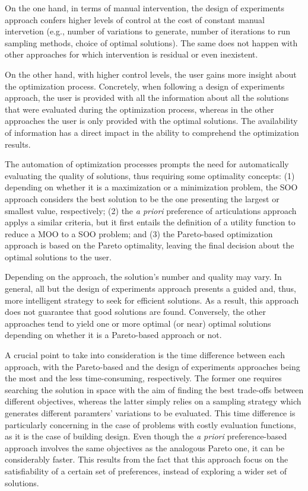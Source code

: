 	On the one hand, in terms of manual intervention, the design of experiments approach confers higher levels of control at the cost of constant manual intervetion (e.g., number of variations to generate, number of iterations to run sampling methods, choice of optimal solutions). The same does not happen with other approaches for which intervention is residual or even inexistent.	
	
	On the other hand, with higher control levels, the user gains more insight about the optimization process. Concretely, when following a design of experiments approach, the user is provided with all the information about all the solutions that were evaluated during the optimization process, whereas in the other approaches the user is only provided with the optimal solutions. The availability of information has a direct impact in the ability to comprehend the optimization results.
	
	The automation of optimization processes prompts the need for automatically evaluating the quality of solutions, thus requiring some optimality concepts: (1) depending on whether it is a maximization or a minimization problem, the \ac{SOO} approach considers the best solution to be the one presenting the largest or smallest value, respectively; (2) the \textit{a priori} preference of articulations approach applys a similar criteria, but it first entails the definition of a utility function to reduce a \ac{MOO} to a \ac{SOO} problem; and (3) the Pareto-based optimization approach is based on the Pareto optimality, leaving the final decision about the optimal solutions to the user.
	
	Depending on the approach, the solution's number and quality may vary. In general, all but the design of experiments approach presents a guided and, thus, more intelligent strategy to seek for efficient solutions. As a result, this approach does not guarantee that good solutions are found. Conversely, the other approaches tend to yield one or more optimal (or near) optimal solutions depending on whether it is a Pareto-based approach or not.
	
	A crucial point to take into consideration is the time difference between each approach, with the Pareto-based and the design of experiments approaches being the most and the less time-consuming, respectively. The former one requires searching the solution in space with the aim of finding the best trade-offs between different objectives, whereas the latter simply relies on a sampling strategy which generates different paramters' variations to be evaluated. This time difference is particularly concerning in the case of problems with costly evaluation functions, as it is the case of building design. Even though the \textit{a priori} preference-based approach involves the same objectives as the analogous Pareto one, it can be considerably faster. This results from the fact that this approach focus on the satisfiability of a certain set of preferences, instead of exploring a wider set of solutions.
	
